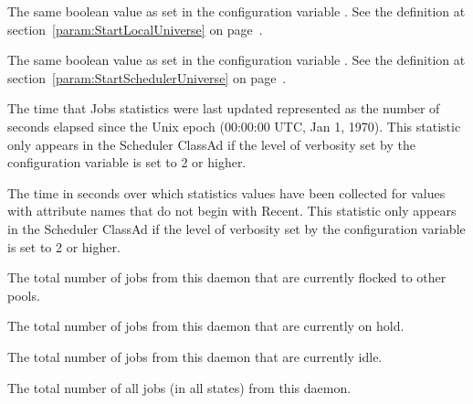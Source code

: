 \begin{description}
\item[\AdAttr{StartLocalUniverse}:] The same boolean value as set in the
  configuration variable .
  See the definition at section~\ref{param:StartLocalUniverse} on
  page~\pageref{param:StartLocalUniverse}.

\item[\AdAttr{StartSchedulerUniverse}:] The same boolean value as set in the
  configuration variable .
  See the definition at section~\ref{param:StartSchedulerUniverse} on
  page~\pageref{param:StartSchedulerUniverse}.

\item[\AdAttr{StatsLastUpdateTime}:] The time that Jobs statistics were last updated
  represented as the number of seconds elapsed since
    the Unix epoch (00:00:00 UTC, Jan 1, 1970).
  This statistic only appears in the Scheduler ClassAd if the level of
  verbosity set by the configuration variable 
  is set to 2 or higher.

\item[\AdAttr{StatsLifetime}:] The time in seconds over which statistics values have been collected
  for values with attribute names that do not begin with Recent.
  This statistic only appears in the Scheduler ClassAd if the level of
  verbosity set by the configuration variable 
  is set to 2 or higher.

\item[\AdAttr{TotalFlockedJobs}:] The total number of jobs from this
   daemon that are currently flocked to other pools.

\item[\AdAttr{TotalHeldJobs}:] The total number of jobs from this
   daemon that are currently on hold.

\item[\AdAttr{TotalIdleJobs}:] The total number of jobs from this
   daemon that are currently idle.

\item[\AdAttr{TotalJobAds}:] The total number of all jobs (in all 
  states) from this  daemon.


\end{description}
